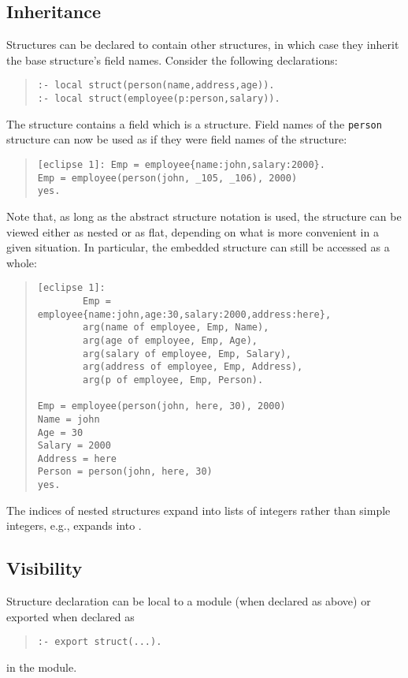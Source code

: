 \subsection{Inheritance}
Structures can be declared to contain other structures,
in which case they inherit the base structure's field names.
Consider the following declarations:
\begin{quote}
\begin{verbatim}
:- local struct(person(name,address,age)).
:- local struct(employee(p:person,salary)).
\end{verbatim}
\end{quote}
The  structure contains a field  which is a
 structure.
Field names of the \verb+person+ structure can now be used as if
they were field names of the  structure:
\begin{quote}
\begin{verbatim}
[eclipse 1]: Emp = employee{name:john,salary:2000}.
Emp = employee(person(john, _105, _106), 2000)
yes.
\end{verbatim}
\end{quote}
Note that, as long as the abstract structure notation is used,
the  structure can be viewed either as nested or as flat,
depending on what is more convenient in a given situation.
In particular, the embedded structure can still be accessed as a whole:
\begin{quote}
\begin{verbatim}
[eclipse 1]:
        Emp = employee{name:john,age:30,salary:2000,address:here},
        arg(name of employee, Emp, Name),
        arg(age of employee, Emp, Age),
        arg(salary of employee, Emp, Salary),
        arg(address of employee, Emp, Address),
        arg(p of employee, Emp, Person).

Emp = employee(person(john, here, 30), 2000)
Name = john
Age = 30
Salary = 2000
Address = here
Person = person(john, here, 30)
yes.
\end{verbatim}
\end{quote}
The indices of nested structures expand into
lists of integers rather than simple integers,
e.g.,  expands into \notation{[1,3]}.


\subsection{Visibility}
Structure declaration can be local to a module (when declared as above)
or exported when declared as
\begin{quote}
\begin{verbatim}
:- export struct(...).
\end{verbatim}
\end{quote}
in the module.


